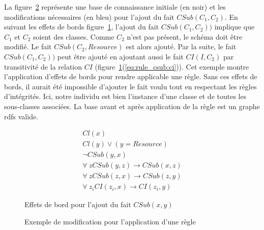 \begin{example}
    La figure~\ref{fig:app_rule} représente une base de connaissance initiale (en noir) et les modifications nécessaires (en bleu) pour l'ajout du fait $CSub(C_1, C_2)$.
    En suivant les effets de bords figure~\ref{eq:rule_csub}, l'ajout du fait $CSub(C_1, C_2))$ implique que $C_1$ et $C_2$ soient des classes.
    Comme $C_2$ n'est pas présent, le schéma doit être modifié.
    Le fait $CSub(C_2, Resource)$ est alors ajouté.
    Par la suite, le fait $CSub(C_1, C_2))$ peut être ajouté en ajoutant aussi le fait $CI(I, C_2)$ par transitivité de la relation $CI$ (figure~\ref{eq:rule_csub}(\ref{eq:rule_csub:ci})).
    Cet exemple montre l'application d'effets de bords pour rendre applicable une règle.
    Sans ces effets de bords, il aurait été impossible d'ajouter le fait voulu tout en respectant les règles d'intégrités.
    Ici, notre individu est bien l'instance d'une classe et de toutes les sous-classes associées.
    La base avant et après application de la règle est un graphe \gls{rdfs} valide.
\end{example}

\begin{figure}[ht]
    \begin{eqnarray*}
        Cl(x)\\
        Cl(y) \lor (y = Resource)\\
        \neg CSub(y, x)\\
        \forall~z CSub(y, z) \to CSub(x, z)\\
        \forall~z CSub(z, x) \to CSub(z, y)\\
        \forall~z_i CI(z_i, x) \to CI(z_i, y) \label{eq:rule_csub:ci}
    \end{eqnarray*}
    \caption{Effets de bord pour l'ajout du fait $CSub(x, y)$}
    \label{eq:rule_csub}
\end{figure}

\begin{figure}[ht]
    \centering
    \caption{Exemple de modification pour l'application d'une règle}
    \label{fig:app_rule}
\end{figure}

